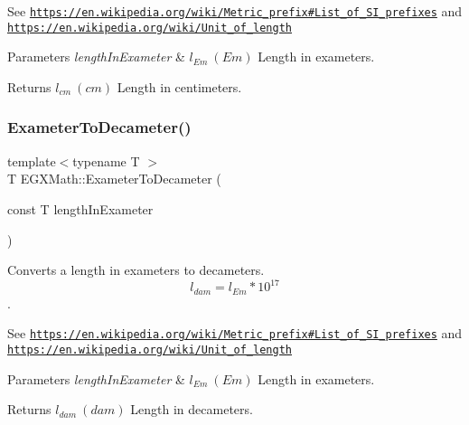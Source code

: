 See \href{https://en.wikipedia.org/wiki/Metric_prefix#List_of_SI_prefixes}{\tt https\+://en.\+wikipedia.\+org/wiki/\+Metric\+\_\+prefix\#\+List\+\_\+of\+\_\+\+S\+I\+\_\+prefixes} and \href{https://en.wikipedia.org/wiki/Unit_of_length}{\tt https\+://en.\+wikipedia.\+org/wiki/\+Unit\+\_\+of\+\_\+length} 
\begin{DoxyParams}{Parameters}
{\em length\+In\+Exameter} & $ l_{Em}\ (Em)$ Length in exameters. \\
\hline
\end{DoxyParams}
\begin{DoxyReturn}{Returns}
$ l_{cm}\ (cm)$ Length in centimeters. 
\end{DoxyReturn}
\mbox{\label{group___e_g_x_math-_conversions-_length_conversions-_exameter-_s_i_ga06159c597dfa489a8981c261622bf574}} 
\subsubsection{\texorpdfstring{Exameter\+To\+Decameter()}{ExameterToDecameter()}}
{\footnotesize\ttfamily template$<$typename T $>$ \\
T E\+G\+X\+Math\+::\+Exameter\+To\+Decameter (\begin{DoxyParamCaption}\item[{const T}]{length\+In\+Exameter }\end{DoxyParamCaption})}



Converts a length in exameters to decameters. \[ l_{dam}=l_{Em} * 10^{17} \]. 

See \href{https://en.wikipedia.org/wiki/Metric_prefix#List_of_SI_prefixes}{\tt https\+://en.\+wikipedia.\+org/wiki/\+Metric\+\_\+prefix\#\+List\+\_\+of\+\_\+\+S\+I\+\_\+prefixes} and \href{https://en.wikipedia.org/wiki/Unit_of_length}{\tt https\+://en.\+wikipedia.\+org/wiki/\+Unit\+\_\+of\+\_\+length} 
\begin{DoxyParams}{Parameters}
{\em length\+In\+Exameter} & $ l_{Em}\ (Em)$ Length in exameters. \\
\hline
\end{DoxyParams}
\begin{DoxyReturn}{Returns}
$ l_{dam}\ (dam)$ Length in decameters. 
\end{DoxyReturn}
\mbox{\label{group___e_g_x_math-_conversions-_length_conversions-_exameter-_s_i_ga6d2909e8189cfc7b07d846a34f277afb}} 
